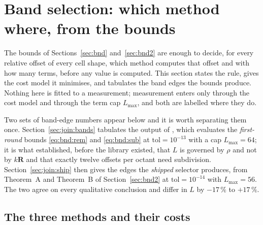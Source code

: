 \section{Band selection: which method where, from the bounds}
\label{sec:join}

The bounds of Sections~\ref{sec:bnd} and~\ref{sec:bnd2} are enough to decide, for every
relative offset of every cell shape, which method computes that offset and with how many
terms, before any value is computed. This section states the rule, gives the cost model it
minimises, and tabulates the band edges the bounds produce. Nothing here is fitted to a
measurement; measurement enters only through the cost model and through the term cap
$L_{\max}$, and both are labelled where they do.

Two sets of band-edge numbers appear below and it is worth separating them once.
Section~\ref{sec:join:bands} tabulates the output of , which evaluates the
\emph{first-round} bounds \eqref{eq:bnd:rem} and \eqref{eq:bnd:sub} at
$\mathrm{tol} = 10^{-13}$ with a cap $L_{\max} = 64$; it is what established, before the
library existed, that $L$ is governed by $\rho$ and not by $k\mathbf{R}$ and that exactly
twelve offsets per octant need subdivision. Section~\ref{sec:join:ship} then gives the
edges the \emph{shipped} selector produces, from Theorem~A and Theorem~B of
Section~\ref{sec:bnd2} at $\mathrm{tol} = 10^{-14}$ with $L_{\max} = 56$. The two agree on
every qualitative conclusion and differ in $L$ by $-17\,\%$ to $+17\,\%$.

\subsection{The three methods and their costs}
\label{sec:join:cost}


